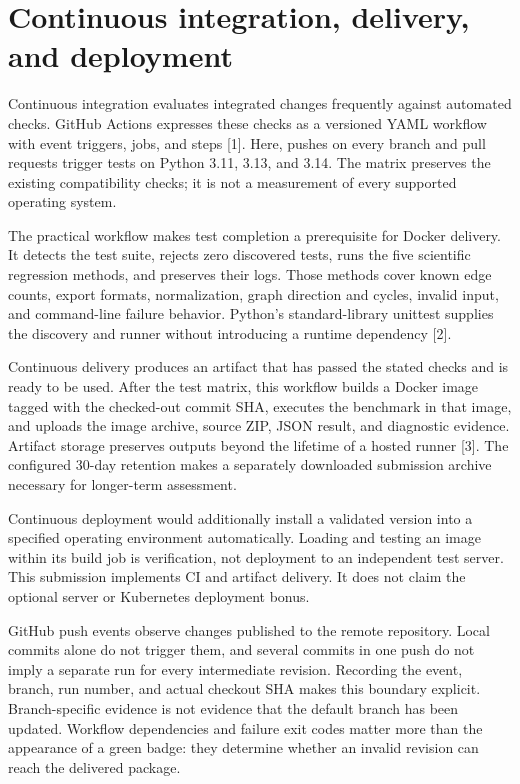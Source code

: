 \newpage
\section{Continuous integration, delivery, and deployment}
Continuous integration evaluates integrated changes frequently against automated checks. GitHub Actions expresses these checks as a versioned YAML workflow with event triggers, jobs, and steps [1]. Here, pushes on every branch and pull requests trigger tests on Python 3.11, 3.13, and 3.14. The matrix preserves the existing compatibility checks; it is not a measurement of every supported operating system.

The practical workflow makes test completion a prerequisite for Docker delivery. It detects the test suite, rejects zero discovered tests, runs the five scientific regression methods, and preserves their logs. Those methods cover known edge counts, export formats, normalization, graph direction and cycles, invalid input, and command-line failure behavior. Python's standard-library unittest supplies the discovery and runner without introducing a runtime dependency [2].

Continuous delivery produces an artifact that has passed the stated checks and is ready to be used. After the test matrix, this workflow builds a Docker image tagged with the checked-out commit SHA, executes the benchmark in that image, and uploads the image archive, source ZIP, JSON result, and diagnostic evidence. Artifact storage preserves outputs beyond the lifetime of a hosted runner [3]. The configured 30-day retention makes a separately downloaded submission archive necessary for longer-term assessment.

Continuous deployment would additionally install a validated version into a specified operating environment automatically. Loading and testing an image within its build job is verification, not deployment to an independent test server. This submission implements CI and artifact delivery. It does not claim the optional server or Kubernetes deployment bonus.

GitHub push events observe changes published to the remote repository. Local commits alone do not trigger them, and several commits in one push do not imply a separate run for every intermediate revision. Recording the event, branch, run number, and actual checkout SHA makes this boundary explicit. Branch-specific evidence is not evidence that the default branch has been updated. Workflow dependencies and failure exit codes matter more than the appearance of a green badge: they determine whether an invalid revision can reach the delivered package.

